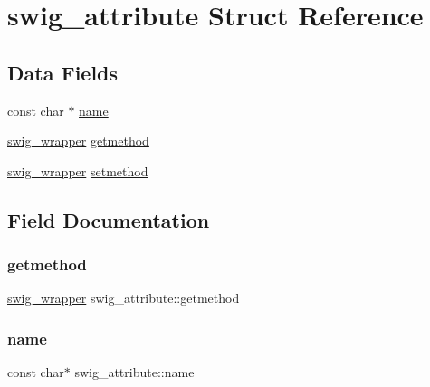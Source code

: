 \hypertarget{structswig__attribute}{}\section{swig\+\_\+attribute Struct Reference}
\label{structswig__attribute}
\subsection*{Data Fields}
\begin{DoxyCompactItemize}
\item 
const char $\ast$ \hyperlink{structswig__attribute_a49a466513dfb02283b02a1f63d721591}{name}
\item 
\hyperlink{pdnsim__wrap_8cpp_a26e4d1918011eb5b4aa36f67e1d5a318}{swig\+\_\+wrapper} \hyperlink{structswig__attribute_a8b25e0a7bf0e8f50b8d78f89cededc26}{getmethod}
\item 
\hyperlink{pdnsim__wrap_8cpp_a26e4d1918011eb5b4aa36f67e1d5a318}{swig\+\_\+wrapper} \hyperlink{structswig__attribute_a472e7eb40e7248b6d4b5cb0118aa1331}{setmethod}
\end{DoxyCompactItemize}


\subsection{Field Documentation}
\mbox{\label{structswig__attribute_a8b25e0a7bf0e8f50b8d78f89cededc26}} 
\subsubsection{\texorpdfstring{getmethod}{getmethod}}
{\footnotesize\ttfamily \hyperlink{pdnsim__wrap_8cpp_a26e4d1918011eb5b4aa36f67e1d5a318}{swig\+\_\+wrapper} swig\+\_\+attribute\+::getmethod}

\mbox{\label{structswig__attribute_a49a466513dfb02283b02a1f63d721591}} 
\subsubsection{\texorpdfstring{name}{name}}
{\footnotesize\ttfamily const char$\ast$ swig\+\_\+attribute\+::name}

